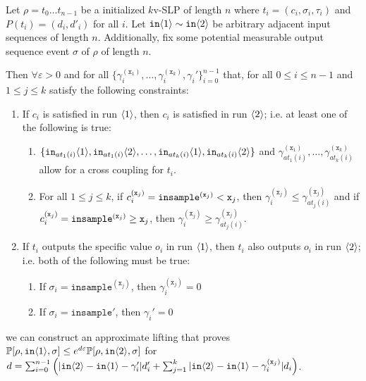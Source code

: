 \begin{lemma}\label{mvPathCouplingLemma}
    Let $\rho = t_0\ldots t_{n-1}$ be a initialized $k$v-SLP of length $n$ where $t_i = (c_i, \sigma_i, \tau_i)$ and $P(t_i) = (d_i, d'_i)$ for all $i$. 
    Let $\texttt{in}\brangle{1}\sim \texttt{in}\brangle{2}$ be arbitrary adjacent input sequences of length $n$. Additionally, fix some potential measurable output sequence event $\sigma$ of $\rho$ of length $n$.

    Then $\forall \varepsilon>0$ and for all $\{\gamma_i^{(\texttt{x}_1)},\ldots, \gamma_i^{(\texttt{x}_k)}, \gamma_i'\}_{i=0}^{n-1}$ that, for all $0\leq i\leq n-1$ and $1\leq j\leq k$ satisfy the following constraints:\begin{enumerate}
        \item If $c_i$ is satisfied in run $\brangle{1}$, then $c_i$ is satisfied in run $\brangle{2}$; i.e. at least one of the following is true:\begin{enumerate}
            \item $\{\texttt{in}_{at_1(i)}\brangle{1}, \texttt{in}_{at_1(i)}\brangle{2}, \ldots, \texttt{in}_{at_k(i)}\brangle{1}, \texttt{in}_{at_k(i)}\brangle{2}\}$ and $\gamma_{at_1(i)}^{(\texttt{x}_1)}, \ldots, \gamma_{at_k(i)}^{(\texttt{x}_k)}$ allow for a cross coupling for $t_i$.
            \item For all $1\leq j \leq k$, if $c_i^{(\texttt{x}_j)} = \mvlguard[\texttt{x}_j]$, then $\gamma_i^{(\texttt{x}_j)}\leq \gamma^{(\texttt{x}_j)}_{at_j(i)}$ and if $c_i^{(\texttt{x}_j)} = \mvgguard[\texttt{x}_j]$, then $\gamma_i^{(\texttt{x}_j)}\geq \gamma^{(\texttt{x}_j)}_{at_j(i)}$.
        \end{enumerate}
        \item If $t_i$ outputs the specific value $o_i$ in run $\brangle{1}$, then $t_i$ also outputs $o_i$ in run $\brangle{2}$; i.e. both of the following must be true: \begin{enumerate}
            \item If $\sigma_i = \texttt{insample}^{(\texttt{x}_j)}$, then $\gamma_i^{(\texttt{x}_j)}=0$
            \item If $\sigma_i = \texttt{insample}'$, then $\gamma_i'=0$
        \end{enumerate}
    \end{enumerate}
     we can construct an approximate lifting that proves $\PP[\rho, \texttt{in}\brangle{1}, \sigma]\leq e^{d\varepsilon}\PP[\rho, \texttt{in}\brangle{2}, \sigma]$ for $d = \sum_{i=0}^{n-1}\left(|\texttt{in}\brangle{2}-\texttt{in}\brangle{1}-\gamma_i'|d_i'+\sum_{j=1}^k|\texttt{in}\brangle{2}-\texttt{in}\brangle{1}-\gamma_i^{(\texttt{x}_j)}|d_i\right)$.
\end{lemma}

